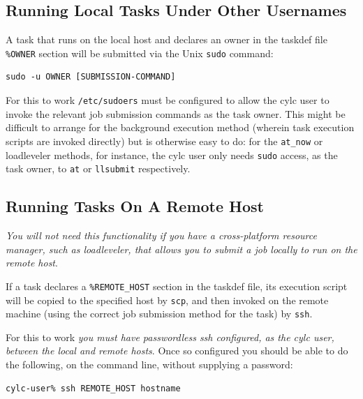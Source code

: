 \documentclass[11pt,a4paper]{article}
\begin{document}
\subsection{Running Local Tasks Under Other Usernames}
\label{RunningLocalTasksUnderOtherUsernames}

\lstset{language=cylctaskdef}

A task that runs on the local host and declares an owner in the taskdef
file \lstinline=%OWNER= section will be submitted via the Unix
\lstinline=sudo= command:  

\lstset{language=bash}

\begin{lstlisting}
sudo -u OWNER [SUBMISSION-COMMAND]
\end{lstlisting}

For this to work \lstinline=/etc/sudoers= must be configured to allow
the cylc user to invoke the relevant job submission commands as the task
owner.  This might be difficult to arrange for the background execution
method (wherein task execution scripts are invoked directly) but is
otherwise easy to do: for the \lstinline=at_now= or loadleveler methods,
for instance, the cylc user only needs \lstinline=sudo= access, as the
task owner, to \lstinline=at= or \lstinline=llsubmit= respectively.

\subsection{Running Tasks On A Remote Host}
\label{RunningTasksOnARemoteHost}

{\em You will not need this functionality if you have a cross-platform
resource manager, such as loadleveler, that allows you to submit a job
locally to run on the remote host}.

If a task declares a \lstinline=%REMOTE_HOST= section in the taskdef
file, its execution script will be copied to the specified host by 
\lstinline=scp=, and then invoked on the remote machine (using the
correct job submission method for the task) by \lstinline=ssh=. 

For this to work {\em you must have passwordless ssh configured, as 
the cylc user, between the local and remote hosts}. Once so configured
you should be able to do the following, on the command line, without
supplying a password:

\begin{lstlisting}
cylc-user% ssh REMOTE_HOST hostname
\end{lstlisting}
\end{document}
